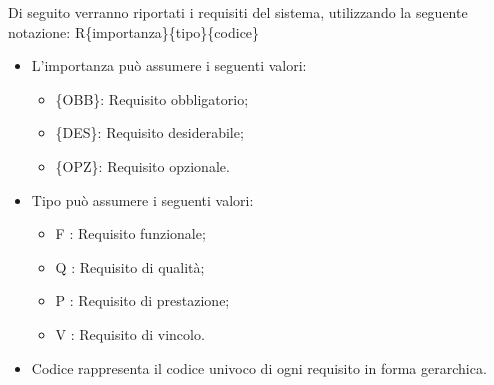 Di seguito verranno riportati i requisiti del sistema, utilizzando la seguente notazione: R\{importanza\}\{tipo\}\{codice\}

\begin{itemize}
	\item L'importanza può assumere i seguenti valori:
	\begin{itemize}
		\item \{OBB\}: Requisito obbligatorio;
		\item \{DES\}: Requisito desiderabile;
		\item \{OPZ\}: Requisito opzionale.
	\end{itemize}
	
	\item Tipo può assumere i seguenti valori:
	\begin{itemize}
		\item {F} : Requisito funzionale;
		\item {Q} : Requisito di qualità;
		\item {P} : Requisito di prestazione;
		\item {V} : Requisito di vincolo.
	\end{itemize}
	
	\item Codice rappresenta il codice univoco di ogni requisito in forma gerarchica.
\end{itemize}
\newpage


\newpage


\newpage


\newpage